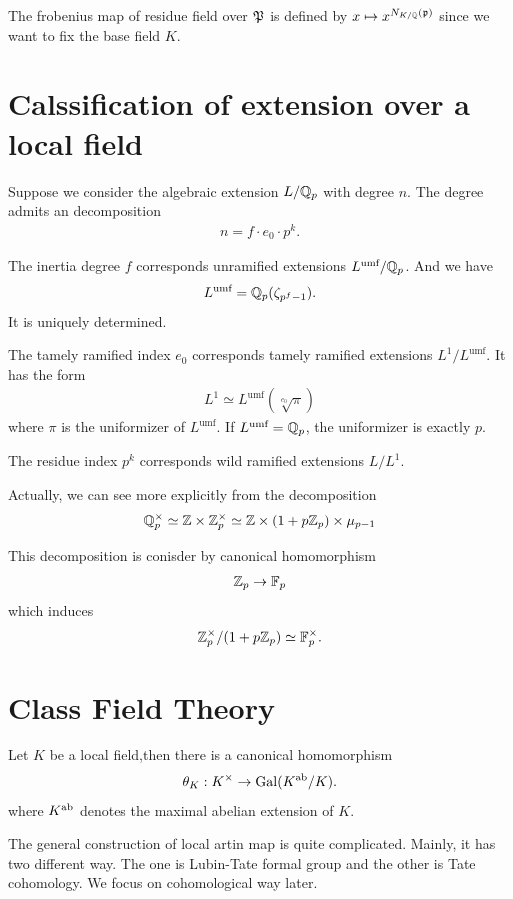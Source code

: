 {The frobenius map of residue field over $\P$ is defined by $x\mapsto x^{N_{K/\Q}(\p)}$ since we want to fix the base field $K$.


\section*{Calssification of extension over a local field}

Suppose we consider the algebraic extension $L/\Q_p$ with degree $n$. 
The degree admits an decomposition 
    \begin{align*}
        n=  f \cdot e_0 \cdot p^k.
    \end{align*} 

The inertia degree $f$ corresponds unramified extensions $L^{\text{umf}}/\Q_p$. And we have 
\begin{align*}
    L^{\text{umf}}=\Q_p(\zeta_{p^f-1}).
\end{align*}
It is uniquely determined.

The tamely ramified index $e_0$ corresponds tamely ramified extensions $L^{1}/L^{\text{umf}}$. It has the form 
\begin{align*}
    L^{1} \simeq L^{\text{umf}}(\sqrt[e_0]{\pi})
\end{align*}
where $\pi$ is the uniformizer of $L^{\text{umf}}$. If $L^{\text{umf}}=\Q_p$, the uniformizer is exactly $p$.

The residue index $p^k$ corresponds wild ramified extensions $L/L^1$.

Actually, we can see more explicitly from the decomposition 
\begin{align*}
    \Q_p^\times\simeq \Z \times \Z^\times_p \simeq \Z\times (1+p\Z_p) \times \mu_{p-1}
\end{align*}

This decomposition is conisder by canonical homomorphism 
\begin{align*}
    \Z_p \to \F_p
\end{align*}
which induces 
\begin{align*}
    \Z_p^\times/(1+p\Z_p) \simeq \F_p^\times.
\end{align*}




\section*{Class Field Theory}



\begin{definition}
    Let $K$ be a local field,then there is a canonical homomorphism
    \begin{align*}
        \theta_{K}: K^\times \to \gal(K^\ab/K).
    \end{align*}
    where $K^\ab$ denotes the maximal abelian extension of $K$.
\end{definition}
The general construction of local artin map is quite complicated. Mainly, it has two different way. The one is Lubin-Tate formal group and the other is 
Tate cohomology. We focus on cohomological way later.


}
